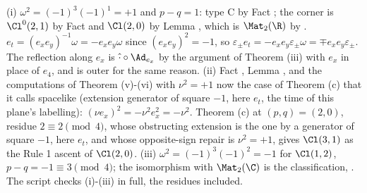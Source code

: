 (i) $\omega^2 = (-1)^3(-1)^1 = +1$ and $p - q = 1$: type C by Fact ; the corner is $\Cl^0(2,1)$ by Fact  and $\Cl(2,0)$ by Lemma , which is $\Mat_2(\R)$ by . $e_t = (e_xe_y)^{-1}\omega = -e_xe_y\omega$ since $(e_xe_y)^2 = -1$, so $\varepsilon_\pm e_t = -e_xe_y\varepsilon_\pm\omega = \mp e_xe_y\varepsilon_\pm$. The reflection along $e_x$ is $\hat{\cdot}\circ\Ad_{e_x}$ by the argument of Theorem (iii) with $e_x$ in place of $e_4$, and is outer for the same reason. (ii) Fact , Lemma , and the computations of Theorem (v)-(vi) with $\nu^2 = +1$ now the case of Theorem (c) that it calls spacelike (extension generator of square $-1$, here $e_t$, the time of this plane's labelling): $(\nu e_x)^2 = -\nu^2e_x^2 = -\nu^2$. Theorem (c) at $(p,q) = (2,0)$, residue $2 \equiv 2 \pmod 4$, whose obstructing extension is the one by a generator of square $-1$, here $e_t$, and whose opposite-sign repair is $\nu^2 = +1$, gives $\Cl(3,1)$ as the Rule 1 ascent of $\Cl(2,0)$. (iii) $\omega^2 = (-1)^3(-1)^2 = -1$ for $\Cl(1,2)$, $p - q = -1 \equiv 3 \pmod 4$; the isomorphism with $\Mat_2(\C)$ is the classification, . The script checks (i)-(iii) in full, the residues included.
